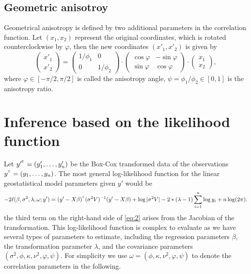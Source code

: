 \documentclass{article}\usepackage[]{graphicx}\usepackage[]{color}
\def\T{{\footnotesize {^{_{\sf T}}}}}
\begin{document}
\subsection{Geometric anisotroy}
Geometrical anisotropy is defined by two additional parameters in the correlation function. Let $(x_1, x_2)$ represent the original coordinates, which is rotated counterclockwise by $\varphi$, then the new coordinates $(x'_1, x'_2)$ is given by
%
  \begin{equation*}\label{eq:matrixeqn}
    \begin{pmatrix}
      x'_{1} \\
      x'_{2}  
    \end{pmatrix}
    =
    \begin{pmatrix}
      1/\phi_{1} & 0 \\
      0 & 1/ \phi_{2} 
    \end{pmatrix}
    \cdot
    \begin{pmatrix}
      \cos \varphi & -\sin \varphi \\
      \sin \varphi & \cos \varphi 
    \end{pmatrix}
    \cdot
      \begin{pmatrix}
      x_1 \\
      x_2 
    \end{pmatrix},
  \end{equation*}
%
where $\varphi \in [-\pi/2, \pi/2]$ is called the anisotropy angle, $\psi = \phi_1 / \phi_2 \in [0,1]$ is the anisotropy ratio. %

\section{Inference based on the likelihood function}
Let $y'^\T=(y'_1,\dots,y'_n)$ be the Box-Cox transformed data of the observations $y^\T=(y_1,\dots,y_n)$. The most general log-likelihood function for the linear geostatistical model parameters given $y'$ would be
%
\begin{equation}
-2\ell(\beta,\sigma^2, \lambda, \omega; y')=(y'-X\beta)^\T(\sigma^2 V)^{-1}(y'-X\beta)+\log |\sigma^2 V|-2*(\lambda-1)\sum_{i=1}^{n}\log y_i+n\log(2\pi).\label{eq:2}
\end{equation}
%
the third term on the right-hand side of \eqref{eq:2} arises from the Jacobian of the transformation. This log-likelihood function is complex to evaluate as we have several types of parameters to estimate, including the regression parameters $\beta$, the transformation parameter $\lambda$, and the covariance parameters $(\sigma^2, \phi,\kappa,\nu^2, \varphi, \psi)$. For simplicity we use $\omega=(\phi,\kappa,\nu^2, \varphi, \psi)$ to denote the correlation parameters in the following. 
\end{document}
